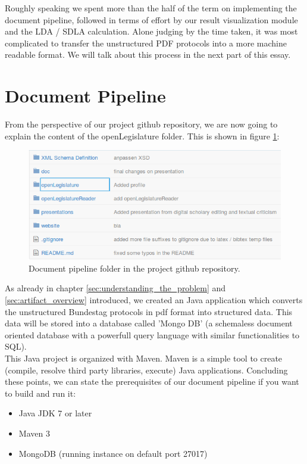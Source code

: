 \documentclass[12pt,paper=a4,nenglish]{scrreprt}
\begin{document}
Roughly speaking we spent more than the half of the term on implementing
the document pipeline, followed in terms of effort by our result visualization
module and the LDA / SDLA calculation. Alone judging by the time taken, it was
most complicated to transfer the unstructured PDF protocols into a more machine
readable format. We will talk about this process in the next part of this essay. 

\section{Document Pipeline} 
From the perspective of our project github repository, we are now going to
explain the content of the openLegislature folder. This is shown in figure
\ref{pic:doc_pipeline_github}: 
\begin{figure}[H] 
	\centering
	\includegraphics[scale=0.7]{res/document_pipeline.png}
	\caption{Document pipeline folder in the project github repository.}%
	\label{pic:doc_pipeline_github}%
\end{figure}%
As already in chapter \ref{sec:understanding_the_problem} and
\ref{sec:artifact_overview} introduced, we created an Java application which
converts the unstructured Bundestag protocols in pdf format into structured
data. This data will be stored into a database called 'Mongo DB' (a
schemaless document oriented database with a powerfull query language with
similar functionalities to SQL). \\
This Java project is organized with Maven. 
Maven is a simple tool to create (compile, resolve third party libraries,
execute) Java applications. Concluding these points, we can state the
prerequisites of our document pipeline if you want to build and run it:
\begin{itemize}
  \item Java JDK 7 or later
  \item Maven 3
  \item MongoDB (running instance on default port 27017) 
\end{itemize}
\end{document}
